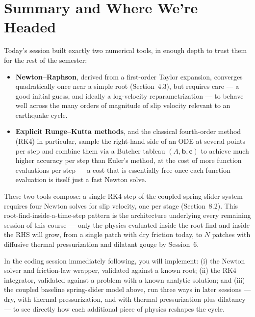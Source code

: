 \section{Summary and Where We're Headed}

Today's session built exactly two numerical tools, in enough depth to trust them for the rest of the semester:

\begin{itemize}
\item \textbf{Newton--Raphson}, derived from a first-order Taylor expansion, converges quadratically once near a simple root (Section~4.3), but requires care --- a good initial guess, and ideally a log-velocity reparametrization --- to behave well across the many orders of magnitude of slip velocity relevant to an earthquake cycle.
\item \textbf{Explicit Runge--Kutta methods}, and the classical fourth-order method (RK4) in particular, sample the right-hand side of an ODE at several points per step and combine them via a Butcher tableau $(A,\mathbf b,\mathbf c)$ to achieve much higher accuracy per step than Euler's method, at the cost of more function evaluations per step --- a cost that is essentially free once each function evaluation is itself just a fast Newton solve.
\end{itemize}

These two tools compose: a single RK4 step of the coupled spring-slider system requires four Newton solves for slip velocity, one per stage (Section~8.2). This root-find-inside-a-time-step pattern is the architecture underlying every remaining session of this course --- only the physics evaluated inside the root-find and inside the RHS will grow, from a single patch with dry friction today, to $N$ patches with diffusive thermal pressurization and dilatant gouge by Session~6.

In the coding session immediately following, you will implement: (i) the Newton solver and friction-law wrapper, validated against a known root; (ii) the RK4 integrator, validated against a problem with a known analytic solution; and (iii) the coupled baseline spring-slider model above, run three ways in later sessions --- dry, with thermal pressurization, and with thermal pressurization plus dilatancy --- to see directly how each additional piece of physics reshapes the cycle.

\appendix
